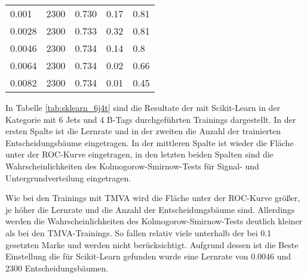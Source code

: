 \begin{table}[tbp]
\begin{center}
\begin{tabular}{lllll}
\num{0,001}  & \num{2300} & \num{0,730} & \num{0,17} & \num{0,81}\\
\num{0,0028} & \num{2300} & \num{0,733} & \num{0,32} & \num{0,81}\\
\num{0,0046} & \num{2300} & \num{0,734} & \num{0,14} & \num{0,8}\\
\num{0,0064} & \num{2300} & \num{0,734} & \num{0,02} & \num{0,66}\\
\num{0,0082} & \num{2300} & \num{0,734} & \num{0,01} & \num{0,45}\\
  \hline
  \end{tabular}
  \end{center}
\end{table}

In Tabelle \ref{tab:sklearn_6j4t} sind die Resultate der mit Scikit-Learn in der Kategorie mit 6 Jets und 4 B-Tags  durchgef\"uhrten Trainings dargestellt. In der ersten Spalte ist die Lernrate und in der zweiten die Anzahl der trainierten Entscheidungsb\"aume eingetragen. In der mittleren Spalte ist wieder die Fl\"ache unter der ROC-Kurve eingetragen, in den letzten beiden Spalten sind die Wahrscheinlichkeiten des Kolmogorow-Smirnow-Tests f\"ur Signal- und Untergrundverteilung eingetragen.

Wie bei den Trainings mit TMVA wird die Fl\"ache unter der ROC-Kurve gr\"o\ss er, je h\"oher die Lernrate und die Anzahl der Entscheidungsb\"aume sind. Allerdings werden die Wahrscheinlichkeiten des Kolmogorow-Smirnow-Tests deutlich kleiner als bei den TMVA-Trainings. So fallen relativ viele unterhalb der bei \num{0,1} gesetzten Marke und werden nicht ber\"ucksichtigt. Aufgrund dessen ist die Beste Einstellung die f\"ur Scikit-Learn gefunden wurde eine Lernrate von \num{0,0046} und \num{2300} Entscheidungsb\"aumen.

